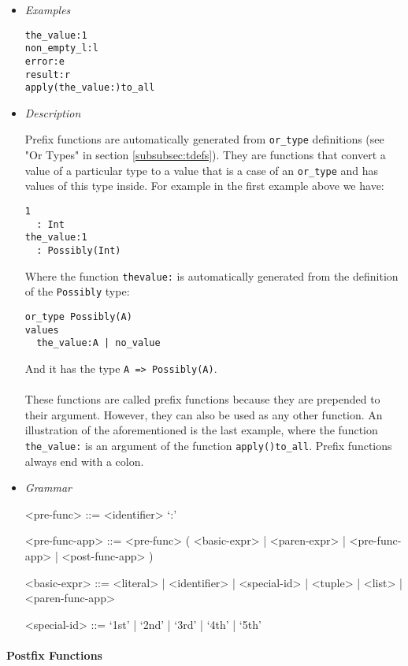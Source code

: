 \documentclass{article}
\begin{document}
\begin{itemize}

\item \textit{Examples}
\begin{verbatim}
the_value:1
non_empty_l:l
error:e
result:r
apply(the_value:)to_all
\end{verbatim}

\item \textit{Description}

Prefix functions are automatically generated from \texttt{or_type} definitions
(see "Or Types" in section \ref{subsubsec:tdefs}). They are functions that
convert a value of a particular type to a value that is a case of an
\texttt{or_type} and has values of this type inside. For example in the
first example above we have:
\begin{verbatim}
1 
  : Int
the_value:1
  : Possibly(Int)
\end{verbatim}
Where the function \texttt{thevalue:} is automatically generated from the
definition of the \texttt{Possibly} type:
\begin{verbatim}
or_type Possibly(A)
values
  the_value:A | no_value
\end{verbatim}
And it has the type \texttt{A => Possibly(A)}.
\\\\
These functions are called prefix functions because they are prepended to
their argument. However, they can also be used as any other function.
An illustration of the aforementioned is the last example, where the function
\texttt{the_value:} is an argument of the function \texttt{apply()to_all}.
Prefix functions always end with a colon.

\item \textit{Grammar}
\begin{grammar}
<pre-func> ::= <identifier> `:'

<pre-func-app> ::=
<pre-func> ( <basic-expr> | <paren-expr> | <pre-func-app> | <post-func-app> )

<basic-expr> ::=
<literal> | <identifier> | <special-id> | <tuple> | <list> | <paren-func-app>

<special-id> ::= `1st' | `2nd' | `3rd' | `4th' | `5th'
\end{grammar}

\end{itemize}

\paragraph{Postfix Functions}
\end{document}
